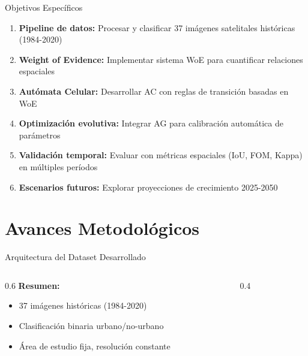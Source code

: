 \documentclass[aspectratio=169]{beamer}
\begin{document}
\begin{frame}{Objetivos Específicos}
  \begin{enumerate}
    \item \textbf{Pipeline de datos:} Procesar y clasificar 37 imágenes satelitales históricas (1984-2020)
    \item \textbf{Weight of Evidence:} Implementar sistema WoE para cuantificar relaciones espaciales
    \item \textbf{Autómata Celular:} Desarrollar AC con reglas de transición basadas en WoE
    \item \textbf{Optimización evolutiva:} Integrar AG para calibración automática de parámetros
    \item \textbf{Validación temporal:} Evaluar con métricas espaciales (IoU, FOM, Kappa) en múltiples períodos
    \item \textbf{Escenarios futuros:} Explorar proyecciones de crecimiento 2025-2050
  \end{enumerate}
\end{frame}

\section{Avances Metodológicos}

\begin{frame}{Arquitectura del Dataset Desarrollado}
  \begin{columns}
    \begin{column}{0.6\textwidth}
      \textbf{Resumen:}
      \begin{itemize}
        \item 37 imágenes históricas (1984-2020)
        \item Clasificación binaria urbano/no-urbano
        \item Área de estudio fija, resolución constante
      \end{itemize}
    \end{column}
    \begin{column}{0.4\textwidth}
      \begin{center}
      \end{center}
    \end{column}
  \end{columns}
\end{frame}
\end{document}
